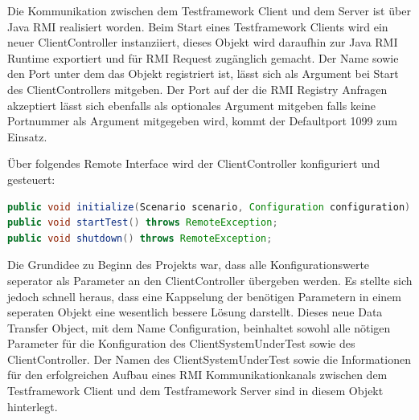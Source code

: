 Die Kommunikation zwischen dem Testframework Client und dem Server ist über Java RMI realisiert worden. Beim Start eines Testframework Clients wird ein neuer ClientController instanziiert, dieses Objekt wird daraufhin zur Java RMI Runtime exportiert und für RMI Request zugänglich gemacht. Der Name sowie den Port unter dem das Objekt registriert ist, lässt sich als Argument bei Start des ClientControllers mitgeben. Der Port auf der die RMI Registry Anfragen akzeptiert lässt sich ebenfalls als optionales Argument mitgeben falls keine Portnummer als Argument mitgegeben wird, kommt der Defaultport 1099 zum Einsatz.

Über folgendes Remote Interface wird der ClientController konfiguriert und gesteuert:
\begin{lstlisting}[language=java, breaklines=true] 	
public void initialize(Scenario scenario, Configuration configuration) throws RemoteException;
public void startTest() throws RemoteException;
public void shutdown() throws RemoteException;
\end{lstlisting}
Die Grundidee zu Beginn des Projekts war, dass alle Konfigurationswerte seperator als Parameter an den ClientController übergeben werden. Es stellte sich jedoch schnell heraus, dass eine Kappselung der benötigen Parametern in einem seperaten Objekt eine wesentlich bessere Lösung darstellt. Dieses neue Data Transfer Object, mit dem Name Configuration, beinhaltet sowohl alle nötigen Parameter für die Konfiguration des ClientSystemUnderTest sowie des ClientController. Der Namen des ClientSystemUnderTest sowie die Informationen für den erfolgreichen Aufbau eines RMI Kommunikationkanals zwischen dem Testframework Client und dem Testframework Server sind in diesem Objekt hinterlegt.

